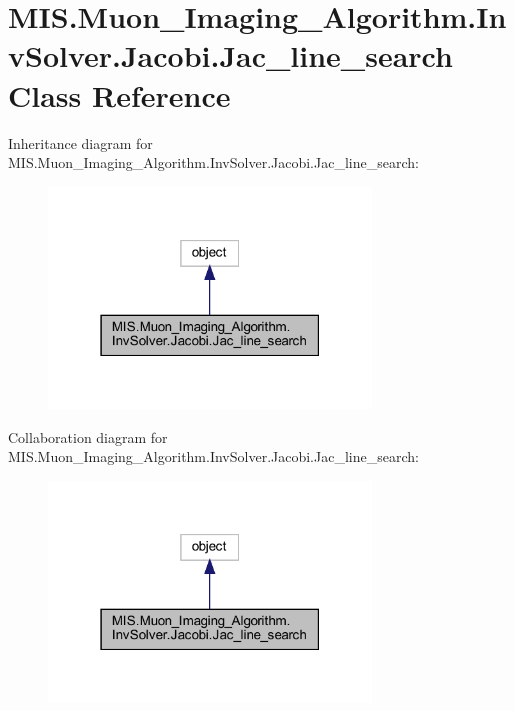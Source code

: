 \hypertarget{classMIS_1_1Muon__Imaging__Algorithm_1_1InvSolver_1_1Jacobi_1_1Jac__line__search}{}\section{M\+I\+S.\+Muon\+\_\+\+Imaging\+\_\+\+Algorithm.\+Inv\+Solver.\+Jacobi.\+Jac\+\_\+line\+\_\+search Class Reference}
\label{classMIS_1_1Muon__Imaging__Algorithm_1_1InvSolver_1_1Jacobi_1_1Jac__line__search}


Inheritance diagram for M\+I\+S.\+Muon\+\_\+\+Imaging\+\_\+\+Algorithm.\+Inv\+Solver.\+Jacobi.\+Jac\+\_\+line\+\_\+search\+:
\nopagebreak
\begin{figure}[H]
\begin{center}
\leavevmode
\includegraphics[width=243pt]{classMIS_1_1Muon__Imaging__Algorithm_1_1InvSolver_1_1Jacobi_1_1Jac__line__search__inherit__graph}
\end{center}
\end{figure}


Collaboration diagram for M\+I\+S.\+Muon\+\_\+\+Imaging\+\_\+\+Algorithm.\+Inv\+Solver.\+Jacobi.\+Jac\+\_\+line\+\_\+search\+:
\nopagebreak
\begin{figure}[H]
\begin{center}
\leavevmode
\includegraphics[width=243pt]{classMIS_1_1Muon__Imaging__Algorithm_1_1InvSolver_1_1Jacobi_1_1Jac__line__search__coll__graph}
\end{center}
\end{figure}
